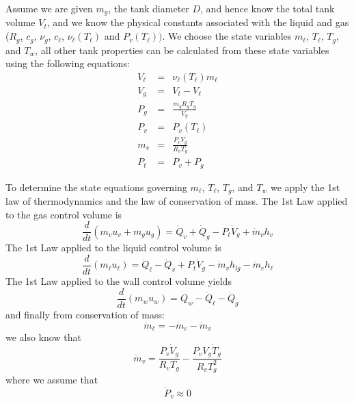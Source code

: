 Assume we are given $m_g$, the tank diameter $D$, and hence know the
total tank volume $V_t$, and we know the physical constants
associated with the liquid and gas ($R_g$, $c_g$, $\nu_g$, $c_\ell$,
$\nu_\ell(T_\ell)$ and $P_v(T_\ell))$. We choose the state variables
$m_\ell$, $T_\ell$, $T_g$, and $T_w$, all other tank properties can
be calculated from these state variables using the following
equations:
%
\begin{eqnarray}
    V_\ell & = &  \nu_\ell(T_\ell)m_\ell \label{Eq:BlowDownVell}\\
    V_g & = &  V_t - V_\ell\\
   P_g & = &  \frac{m_g R_g T_g}{V_g}\\
   P_v & = &  P_v(T_\ell)\\
   m_v & = & \frac{P_v V_g}{R_v T_g}\\
   P_t & = &  P_v + P_g \label{Eq:BlowDownPt}
\end{eqnarray}

%
To determine the state equations governing $m_\ell$, $T_\ell$,
$T_g$, and $T_w$ we apply the 1st law of thermodynamics and the law
of conservation of mass. The 1st Law applied to the gas control
volume is
%
\begin{equation}
   \frac{d}{dt}\left( m_v u_v + m_g u_g \right) = \dot{Q}_v + \dot{Q}_g - P_t \dot{V}_g +
    \dot{m}_v h_{v} \label{Eq:BlowdownGas1stLaw}
\end{equation}
%
The 1st Law applied to the liquid control volume is
%
\begin{equation}
   \frac{d}{dt}\left( m_\ell u_\ell \right) = \dot{Q}_\ell - \dot{Q}_v +
   P_t \dot{V}_g - \dot{m}_v h_{lg} - \dot{m}_e h_\ell \label{Eq:BlowdownLiquid1stLaw}
\end{equation}
%
The 1st Law applied to the wall control volume yields
%
\begin{equation}
     \frac{d}{dt}\left( m_w u_w \right) = \dot{Q}_w - \dot{Q}_\ell - \dot{Q}_g \label{Eq:BlowdownWall1stLaw}
\end{equation}
%
and finally from conservation of mass:
%
\begin{equation}
    \dot{m}_\ell = -\dot{m}_e - \dot{m}_v \label{Eq:BlowdownMassCon}
\end{equation}
%
we also know that
%
\begin{equation}
    \dot{m}_v = \frac{P_v \dot{V}_g}{R_v T_g} - \frac{P_v V_g \dot{T}_g}{R_v T_g^2} \label{Eq:BlowDownGasLaw}
\end{equation}
%
where we assume that
%
\begin{equation}
   \dot{P}_v \approx 0
\end{equation}

